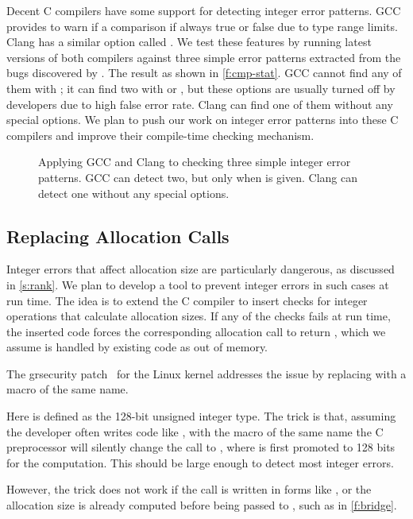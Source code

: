 Decent C compilers have some support for detecting integer error
patterns.
%
GCC provides  to warn if a comparison if always
true or false due to type range limits.
%
Clang has a similar option called .
%
We test these features by running latest versions of both compilers
against three simple error patterns extracted from the bugs discovered
by \sys.  The result as shown in \autoref{f:cmp-stat}.  GCC cannot
find any of them with ; it can find two with 
or , but these options are usually turned off by
developers due to high false error rate.  Clang can find one of them
without any special options.
%
%
We plan to push our work on integer error patterns into these C
compilers and improve their compile-time checking mechanism.

\begin{figure}
\centering

\caption{Applying GCC and Clang to checking three simple integer
error patterns.  GCC can detect two, but only when  is
given.  Clang can detect one without any special options.}
\label{f:cmp-stat}
\end{figure}

\subsection{Replacing Allocation Calls}

Integer errors that affect allocation size are particularly dangerous,
as discussed in \autoref{s:rank}.
We plan to develop a tool to prevent integer errors
in such cases at run time.
The idea is to extend the C compiler
to insert checks for integer operations that calculate allocation sizes.
If any of the checks fails at run time,
the inserted code forces the corresponding allocation call to return
, which we assume is handled by existing code
as out of memory.

\fi

The grsecurity patch~\cite{grsecurity}
for the Linux kernel addresses the issue by replacing
 with a macro of the same name.
%

%
Here  is defined as the 128-bit unsigned integer
type.  The trick is that, assuming the developer often writes code
like , with the macro of the same name
the C preprocessor will silently change the call to
, where  is first
promoted to 128 bits for the computation.  This should be large
enough to detect most integer errors.

However, the trick does not work if the call is written in forms
like , or the allocation
size is already computed before being passed to , such
as in \autoref{f:bridge}.
\fi
